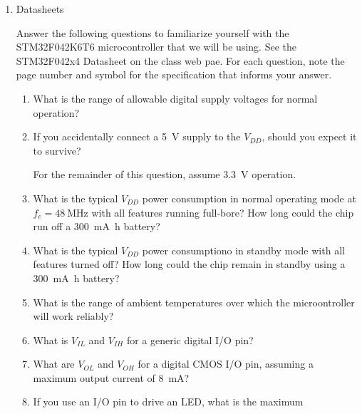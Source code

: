 \documentclass{e85}
\begin{document}
\begin{enumerate}
\item Datasheets

  Answer the following questions to familiarize yourself with the
  STM32F042K6T6 microcontroller that we will be using.  See the
  STM32F042x4 Datasheet on the class web pae.  For each question, note
  the page number and symbol for the specification that informs your
  answer.
  \begin{enumerate}
  \item What is the range of allowable digital supply voltages for
    normal operation?
    \begin{solution}
    \end{solution}
  \item If you accidentally connect a \SI{5}{\V} supply to the
    \(V_{DD}\), should you expect it to survive?
    \begin{solution}
    \end{solution}
    For the remainder of this question, assume \SI{3.3}{\V} operation.
  \item What is the typical \(V_{DD}\) power consumption in normal
    operating mode at \(f_c = \SI{48}{\MHz}\) with all features
    running full-bore?  How long could the chip run off a \SI{300}{\mA
      \hour} battery?
    \begin{solution}
    \end{solution}
  \item What is the typical \(V_{DD}\) power consumptiono in standby
    mode with all features turned off?  How long could the chip remain
    in standby using a \SI{300}{\mA \hour} battery?
    \begin{solution}
    \end{solution}
  \item What is the range of ambient temperatures over which the
    microontroller will work reliably?
    \begin{solution}
    \end{solution}
  \item What is \(V_{IL}\) and \(V_{IH}\) for a generic digital I/O
    pin?
    \begin{solution}
    \end{solution}
  \item What are \(V_{OL}\) and \(V_{OH}\) for a digital CMOS I/O pin,
    assuming a maximum output current of \SI{8}{\mA}?
    \begin{solution}
    \end{solution}
  \item If you use an I/O pin to drive an LED, what is the maximum

\end{enumerate}
\end{enumerate}
\end{document}
